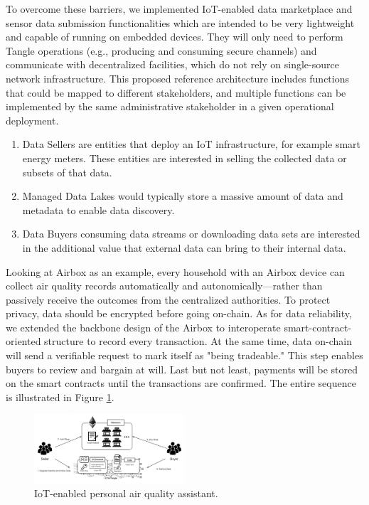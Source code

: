 \documentclass[journal,article,submit,moreauthors,pdftex]{Definitions/mdpi}
\begin{document}
To overcome these barriers, we implemented IoT-enabled data marketplace and sensor data submission functionalities which are intended to be very lightweight and capable of running on embedded devices. They will only need to perform Tangle operations (e.g., producing and consuming secure channels) and communicate with decentralized facilities, which do not rely on single-source network infrastructure. This proposed reference architecture includes functions that could be mapped to different stakeholders, and multiple functions can be implemented by the same administrative stakeholder in a given operational deployment.
\begin{enumerate}[leftmargin=*,labelsep=4.9mm]
    \item Data Sellers are entities that deploy an IoT infrastructure, for example smart energy meters. These entities are interested in selling the collected data or subsets of that data.
    \item Managed Data Lakes would typically store a massive amount of data and metadata to enable data discovery.
    \item Data Buyers consuming data streams or downloading data sets are interested in the additional value that external data can bring to their internal data.
\end{enumerate}

Looking at Airbox\cite{LASS} as an example, every household with an Airbox device can collect air quality records automatically and autonomically—rather than passively receive the outcomes from the centralized authorities. To protect privacy, data should be encrypted before going on-chain. As for data reliability, we extended the backbone design of the Airbox to interoperate smart-contract-oriented structure to record every transaction. At the same time, data on-chain will send a verifiable request to mark itself as "being tradeable." This step enables buyers to review and bargain at will. Last but not least, payments will be stored on the smart contracts until the transactions are confirmed. The entire sequence is illustrated in Figure \ref{fig:airbox}.

\begin{figure}[h]
    \centering
    \includegraphics[width=0.5\textwidth]{airbox}
    \caption{IoT-enabled personal air quality assistant.}
    \label{fig:airbox}
\end{figure}
 
\end{document}
